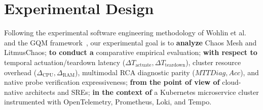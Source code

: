 \section{Experimental Design}
\label{sec:experimental_design}

Following the experimental software engineering methodology of Wohlin et al.~\cite{wohlin_2012} and the GQM framework~\cite{basili_1994}, our experimental goal is to \textbf{analyze} Chaos Mesh and LitmusChaos; \textbf{to conduct a} comparative empirical evaluation; \textbf{with respect to} temporal actuation/teardown latency ($\Delta T_{\text{actuate}}, \Delta T_{\text{teardown}}$), cluster resource overhead ($\Delta_{\text{CPU}}, \Delta_{\text{RAM}}$), multimodal RCA diagnostic parity ($MTTDiag, Acc$), and native probe verification expressiveness; \textbf{from the point of view of} cloud-native architects and SREs; \textbf{in the context of} a Kubernetes microservice cluster instrumented with OpenTelemetry, Prometheus, Loki, and Tempo.

